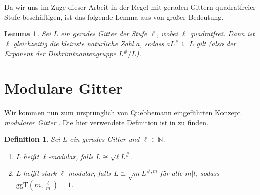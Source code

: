 \documentclass[12pt,a4paper,halfparskip,headsepline,bibtotocnumbered]{scrreprt}
\theoremstyle{nummermitklammern}
\newtheorem{definition}[defsatzusw]{Definition}
\newtheorem{lemma}[defsatzusw]{Lemma}
\theoremstyle{nonumberbreak}
\newcommand{\N}{\mathbb{N}}
\newcommand{\ggT}{\text{ggT}}
\begin{document}
Da wir uns im Zuge dieser Arbeit in der Regel mit geraden Gittern quadratfreier Stufe beschäftigen, ist das folgende Lemma aus \cite[Lemma 1.1.1]{juergens} von großer Bedeutung.

\begin{framed}
	\begin{lemma}\label{lem:level}
		Sei $L$ ein gerades Gitter der Stufe $\ell$, wobei $\ell$ quadratfrei. Dann ist $\ell$ gleichzeitig die kleinste natürliche Zahl $a$, sodass $a L^\# \subseteq L$ gilt (also der Exponent der Diskriminantengruppe $L^\# / L$).
	\end{lemma}
\end{framed}

\section{Modulare Gitter}

Wir kommen nun zum ursprünglich von Quebbemann eingeführten Konzept \textit{modularer Gitter} \cite{quebbemann}. Die hier verwendete Definition ist in \cite{fluckiger} zu finden.

\begin{framed}
	\begin{definition}
		Sei $L$ ein gerades Gitter und $\ell \in \N$.
		\begin{enumerate}[label=(\roman*)]
			\item $L$ heißt \textit{$\ell$-modular}, falls $L \cong \sqrt{\ell}L^\#$.
			\item $L$ heißt \textit{stark $\ell$-modular}, falls $L \cong \sqrt{m} L^{\#,m}$ für alle $m \vert l$, sodass $\ggT(m,\frac{\ell}{m}) = 1$.
		\end{enumerate}
	\end{definition}
\end{framed}
\end{document}
